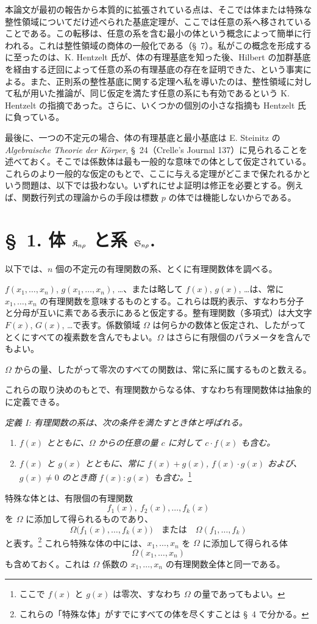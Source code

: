 \documentclass[11pt]{jlreq}
\begin{document}
本論文が最初の報告から本質的に拡張されている点は、そこでは体または特殊な整性領域についてだけ述べられた基底定理が、ここでは任意の系へ移されていることである。この転移は、任意の系を含む最小の体という概念によって簡単に行われる。これは整性領域の商体の一般化である（\S\ 7）。私がこの概念を形成するに至ったのは、K. Hentzelt 氏が、体の有理基底を知った後、Hilbert の加群基底を経由する迂回によって任意の系の有理基底の存在を証明できた、という事実による。また、正則系の整性基底に関する定理へ私を導いたのは、整性領域に対して私が用いた推論が、同じ仮定を満たす任意の系にも有効であるという K. Hentzelt の指摘であった。さらに、いくつかの個別の小さな指摘も Hentzelt 氏に負っている。

最後に、一つの不定元の場合、体の有理基底と最小基底は E. Steinitz の \emph{Algebraische Theorie der Körper}, \S\ 24（Crelle's Journal 137）に見られることを述べておく。そこでは係数体は最も一般的な意味での体として仮定されている。これらのより一般的な仮定のもとで、ここに与える定理がどこまで保たれるかという問題は、以下では扱わない。いずれにせよ証明は修正を必要とする。例えば、関数行列式の理論からの手段は標数 $p$ の体では機能しないからである。

\section*{\S\ 1. 体 $\mathfrak{K}_{n\rho}$ と系 $\mathfrak{S}_{n\rho}$.}

以下では、$n$ 個の不定元の有理関数の系、とくに有理関数体を調べる。

$f(x_1,\ldots,x_n)$, $g(x_1,\ldots,x_n)$, \ldots、または略して $f(x)$, $g(x)$, \ldots は、常に $x_1,\ldots,x_n$ の有理関数を意味するものとする。これらは既約表示、すなわち分子と分母が互いに素である表示にあると仮定する。整有理関数（多項式）は大文字 $F(x)$, $G(x)$, \ldots で表す。係数領域 $\Omega$ は何らかの数体と仮定され、したがってとくにすべての複素数を含んでもよい。$\Omega$ はさらに有限個のパラメータを含んでもよい。

$\Omega$ からの量、したがって零次のすべての関数は、常に系に属するものと数える。

これらの取り決めのもとで、有理関数からなる体、すなわち有理関数体は抽象的に定義できる。

\emph{定義 I: 有理関数の系は、次の条件を満たすとき体と呼ばれる。}
\begin{enumerate}
\item \emph{$f(x)$ とともに、$\Omega$ からの任意の量 $c$ に対して $c\cdot f(x)$ も含む。}
\item \emph{$f(x)$ と $g(x)$ とともに、常に $f(x)+g(x)$, $f(x)\cdot g(x)$ および、$g(x)\ne0$ のとき商 $f(x):g(x)$ も含む。}\footnote{ここで $f(x)$ と $g(x)$ は零次、すなわち $\Omega$ の量であってもよい。}
\end{enumerate}
特殊な体とは、有限個の有理関数
\[
  f_1(x),\ f_2(x),\ldots, f_k(x)
\]
を $\Omega$ に添加して得られるものであり、
\[
  \Omega\bigl(f_1(x),\ldots,f_k(x)\bigr)
  \quad\text{または}\quad
  \Omega(f_1,\ldots,f_k)
\]
と表す。\footnote{これらの「特殊な体」がすでにすべての体を尽くすことは \S\ 4 で分かる。}
これら特殊な体の中には、$x_1,\ldots,x_n$ を $\Omega$ に添加して得られる体
\[
  \Omega(x_1,\ldots,x_n)
\]
も含めておく。これは $\Omega$ 係数の $x_1,\ldots,x_n$ の有理関数全体と同一である。
\end{document}
